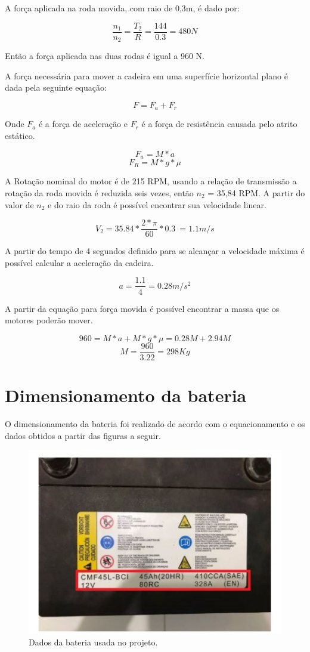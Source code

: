A força aplicada na roda movida, com raio de 0,3m, é dado por:

\[\frac{n_1}{n_2} = \frac{T_2}{R} = \frac{144}{0.3} = 480 N\]

Então a força aplicada nas duas rodas é igual a 960 N.

A força necessária para mover a cadeira em uma superfície horizontal plano é dada pela seguinte equação:

\[F = F_a + F_r\]

Onde \(F_a\) é a força de aceleração e \(F_r\)  é a força de resistência causada pelo atrito estático.

\[F_a = M*a\]
\[F_R = M*g*\mu\]

A Rotação nominal do motor é de 215 RPM, usando a relação de transmissão a
rotação da roda movida é reduzida seis vezes, então \(n_2\) = 35,84 RPM. A
partir do valor de \(n_2\) e do raio da roda é possível encontrar sua
velocidade linear.

\[V_2 = 35.84 * \frac{2*\pi}{60}*0.3\ = 1.1 m/s\]

A partir do tempo de 4 segundos definido para se alcançar a velocidade máxima
é possível calcular a aceleração da cadeira.

\[a = \frac{1.1}{4} = 0.28 m/s^2\]

A partir da equação para força movida é possível encontrar a massa que os
motores poderão mover.

\[960 = M*a + M*g*\mu = 0.28M + 2.94M\]
\[M = \frac{960}{3.22} = 298 Kg\]

\section{Dimensionamento da bateria}

O dimensionamento da bateria foi realizado de acordo com o equacionamento e
os dados obtidos a partir das figuras a seguir.

\begin{figure}[h!]
  \centering
  \includegraphics{figuras/Bateria1.jpg}
  \caption{Dados da bateria usada no projeto.}
\end{figure}

